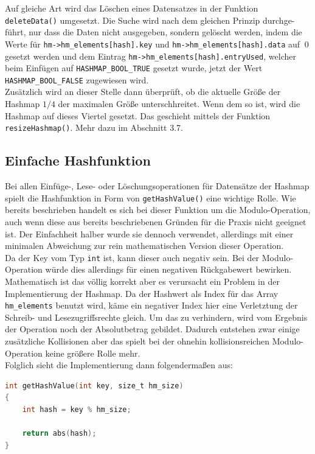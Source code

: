 \documentclass[11pt,a4paper]{article}
\begin{document}
Auf gleiche Art wird das Löschen eines Datensatzes in der Funktion \lstinline{deleteData()} umgesetzt. Die Suche wird nach dem gleichen Prinzip durchge-
führt, nur dass die Daten nicht ausgegeben, sondern gelöscht werden, indem die Werte für \lstinline{hm->hm_elements[hash].key} und \lstinline{hm->hm_elements[hash].data} 
auf $~0$ gesetzt werden und dem Eintrag \lstinline{hm->hm_elements[hash].entryUsed}, welcher beim Einfügen auf \lstinline{HASHMAP_BOOL_TRUE} gesetzt wurde, jetzt der Wert \lstinline{HASHMAP_BOOL_FALSE} zugewiesen wird.\\
Zusätzlich wird an dieser Stelle dann überprüft, ob die aktuelle Größe der Hashmap $1/4$ der maximalen Größe unterschhreitet. Wenn dem so ist, wird die Hashmap auf dieses Viertel gesetzt. Das 
geschieht mittels der Funktion \lstinline{resizeHashmap()}. Mehr dazu im Abschnitt 3.7.

\subsection{Einfache Hashfunktion}

Bei allen Einfüge-, Lese- oder Löschungsoperationen für Datensätze der Hashmap spielt die Hashfunktion in Form von \lstinline{getHashValue()} eine wichtige Rolle.
Wie bereits beschrieben handelt es sich bei dieser Funktion um die Modulo-Operation, auch wenn diese aus bereits beschriebenen Gründen für die Praxis nicht geeignet ist.
Der Einfachheit halber wurde sie dennoch verwendet, allerdings mit einer minimalen Abweichung zur rein mathematischen Version dieser Operation.\\
Da der Key vom Typ \lstinline{int} ist, kann dieser auch negativ sein. Bei der Modulo-Operation würde dies allerdings für einen negativen Rückgabewert bewirken.
Mathematisch ist das völlig korrekt aber es verursacht ein Problem in der Implementierung der Hashmap. Da der Hashwert als Index für das Array \lstinline{hm_elements} benutzt wird, 
käme ein negativer Index hier eine Verletztung der Schreib- und Lesezugriffsrechte gleich. Um das zu verhindern, wird vom Ergebnis der Operation noch der Absolutbetrag gebildet. 
Dadurch entstehen zwar einige zusätzliche Kollisionen aber das spielt bei der ohnehin kollisionsreichen Modulo-Operation keine größere Rolle mehr.\\
Folglich sieht die Implementierung dann folgendermaßen aus:\\

\begin{lstlisting}[language=C]
    int getHashValue(int key, size_t hm_size)
{   
    int hash = key % hm_size;

    return abs(hash);
}
\end{lstlisting}
\end{document}
